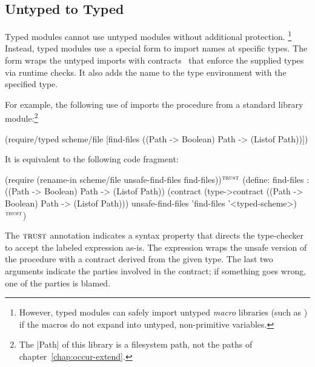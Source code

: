 \begin{schemeregion}
\subsection{Untyped to Typed}


Typed modules cannot use untyped modules without additional protection.%
\footnote{However, typed modules can safely import untyped
  \emph{macro} libraries (such as ) if the macros do not
  expand into untyped, non-primitive variables.}
%
Instead, typed modules use a special  form to
import names at specific types. The  form wraps
the untyped imports with contracts~\cite{ff:ho-contracts} that enforce
the supplied types via runtime checks. It also adds the name to the type
environment with the specified type.

For example, the following use of  imports the
 procedure from a standard library
module:\footnote{The \scheme|Path| of this library is a filesystem
  path, not the paths of chapter~\ref{chap:occur-extend}.}
\begin{schemedisplay}
(require/typed scheme/file
  [find-files ((Path -> Boolean) Path -> (Listof Path))])
\end{schemedisplay}
It is equivalent to the following code fragment:
\begin{schemedisplay}
(require (rename-in scheme/file unsafe-find-files find-files))$^{\mbox{\scriptsize \textsc{trust}}}$
(define: find-files : ((Path -> Boolean) Path -> (Listof Path))
  (contract (type->contract
             ((Path -> Boolean) Path -> (Listof Path)))
            unsafe-find-files
            'find-files
            '<typed-scheme>)$^{\mbox{\scriptsize \textsc{trust}}}$)
\end{schemedisplay}
The $\textsc{trust}$ annotation indicates a syntax property that directs the
type-checker to accept the labeled expression as-is.
%
The  expression wraps the unsafe version of the
 procedure with a contract derived from the given
type. The last two arguments indicate the parties involved in the
contract; if something goes wrong, one of the parties is blamed.


\end{schemeregion}
